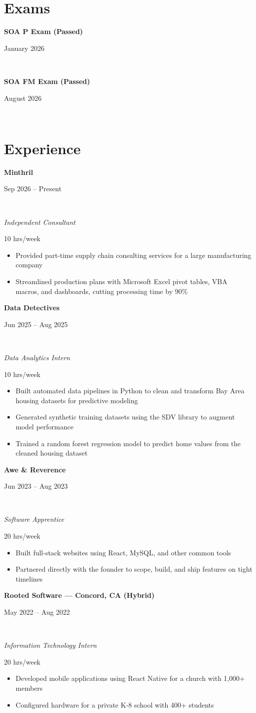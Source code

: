 \documentclass[11pt,letterpaper]{article}
\newcommand{\jobentry}[4]{%
  \noindent\begin{minipage}[t]{0.72\textwidth}\raggedright\textbf{#1}\end{minipage}%
  \hfill\begin{minipage}[t]{0.26\textwidth}\raggedleft\small\color{gray}#2\end{minipage}\\
  \begin{minipage}[t]{0.72\textwidth}\raggedright\textit{#3}\end{minipage}%
  \hfill\begin{minipage}[t]{0.26\textwidth}\raggedleft\small\color{gray}#4\end{minipage}\par\vspace{2pt}
}
\newcommand{\examentry}[2]{%
  \noindent\begin{minipage}[t]{0.72\textwidth}\raggedright\textbf{#1}\end{minipage}%
  \hfill\begin{minipage}[t]{0.26\textwidth}\raggedleft\small\color{gray}#2\end{minipage}\\[1pt]
}
\begin{document}


\vspace{4pt}



\section*{Exams}
\examentry{SOA P Exam (Passed)}{January 2026}
\examentry{SOA FM Exam (Passed)}{August 2026}

\section*{Experience}

\jobentry{Minthril}{Sep 2026 -- Present}{Independent Consultant}{10 hrs/week}
\begin{itemize}
  \item Provided part-time supply chain consulting services for a large manufacturing company
  \item Streamlined production plans with Microsoft Excel pivot tables, VBA macros, and dashboards, cutting processing time by 90\%
\end{itemize}

\jobentry{Data Detectives}{Jun 2025 -- Aug 2025}{Data Analytics Intern}{10 hrs/week}
\begin{itemize}
  \item Built automated data pipelines in Python to clean and transform Bay Area housing datasets for predictive modeling
  \item Generated synthetic training datasets using the SDV library to augment model performance
  \item Trained a random forest regression model to predict home values from the cleaned housing dataset
\end{itemize}

\jobentry{Awe \& Reverence}{Jun 2023 -- Aug 2023}{Software Apprentice}{20 hrs/week}
\begin{itemize}
  \item Built full-stack websites using React, MySQL, and other common tools
  \item Partnered directly with the founder to scope, build, and ship features on tight timelines
\end{itemize}

\jobentry{Rooted Software --- Concord, CA (Hybrid)}{May 2022 -- Aug 2022}{Information Technology Intern}{20 hrs/week}
\begin{itemize}
  \item Developed mobile applications using React Native for a church with 1,000+ members
  \item Configured hardware for a private K-8 school with 400+ students
\end{itemize}
\end{document}
